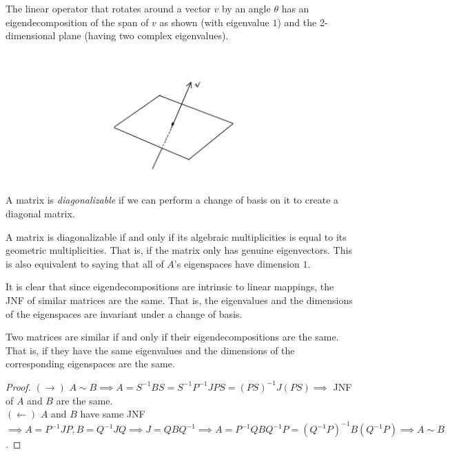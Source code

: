 \documentclass{article}
\begin{document}
    \begin{example}
    The linear operator that rotates around a vector $v$ by an angle $\theta$ has an eigendecomposition of the span of $v$ as shown (with eigenvalue $1$) and the 2-dimensional plane (having two complex eigenvalues). 
    \begin{center}
        \includegraphics[scale=0.25]{img/Rotation_Map_Eigendecomposition.PNG}
    \end{center}
    \end{example}

    \begin{definition}
    A matrix is \textit{diagonalizable} if we can perform a change of basis on it to create a diagonal matrix. 
    \end{definition}

    \begin{theorem}
    A matrix is diagonalizable if and only if its algebraic multiplicities is equal to its geometric multiplicities. That is, if the matrix only has genuine eigenvectors. This is also equivalent to saying that all of $A$'s eigenspaces have dimension $1$. 
    \end{theorem}

    It is clear that since eigendecompositions are intrinsic to linear mappings, the JNF of similar matrices are the same. That is, the eigenvalues and the dimensions of the eigenspaces are invariant under a change of basis. 

    \begin{proposition}
    Two matrices are similar if and only if their eigendecompositions are the same. That is, if they have the same eigenvalues and the dimensions of the corresponding eigenspaces are the same. 
    \end{proposition}

    \begin{proof}
    $(\rightarrow)$ $A \sim B \implies A = S^{-1} B S = S^{-1} P^{-1} J P S = (PS)^{-1} J (PS) \implies$ JNF of $A$ and $B$ are the same.  \\
    $(\leftarrow)$ $A$ and $B$ have same JNF $\implies A = P^{-1} J P, B = Q^{-1} J Q \implies J = Q B Q^{-1} \implies A = P^{-1} Q B Q^{-1} P = (Q^{-1} P)^{-1} B (Q^{-1} P) \implies A \sim B$. 
    \end{proof}
\end{document}
